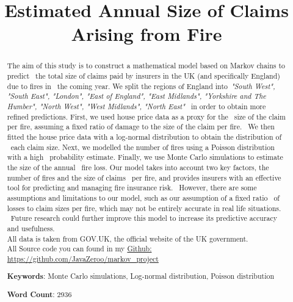 \documentclass[12pt]{article}  %
\title{Estimated Annual Size of Claims Arising from Fire}  %
\begin{document}
\begin{abstract}
    The aim of this study is to construct a mathematical model based on Markov chains to predict \
    the total size of claims paid by insurers in the UK (and specifically England) due to fires in \
    the coming year. We split the regions of England into\ 
    \emph{"South West", "South East", "London", "East of England", "East Midlands", "Yorkshire and The Humber", "North West", "West Midlands", "North East"} \ 
    in order to obtain more refined predictions. First, we used house price data as a proxy for the \
    size of the claim per fire, assuming a fixed ratio of damage to the size of the claim per fire. \
    We then fitted the house price data with a log-normal distribution to obtain the distribution of \
    each claim size. Next, we modelled the number of fires using a Poisson distribution with a high \
    probability estimate. Finally, we use Monte Carlo simulations to estimate the size of the annual \
    fire loss. Our model takes into account two key factors, the number of fires and the size of claims \
    per fire, and provides insurers with an effective tool for predicting and managing fire insurance risk. \
    However, there are some assumptions and limitations to our model, such as our assumption of a fixed ratio \
    of losses to claim sizes per fire, which may not be entirely accurate in real life situations. \
    Future research could further improve this model to increase its predictive accuracy and usefulness. \\
    All data is taken from GOV.UK, the official website of the UK government.\\
    
    All Source code you can found in my \href{https://github.com/JavaZeroo/markov\_project}{Github: https://github.com/JavaZeroo/markov\_project}
    

    \vspace{5pt}
    \textbf{Keywords}: Monte Carlo simulations, Log-normal distribution, Poisson distribution


    \vspace{5pt}
    \textbf{Word Count}: 2936


\end{abstract}

\maketitle  %
\tableofcontents  %
\end{document}
